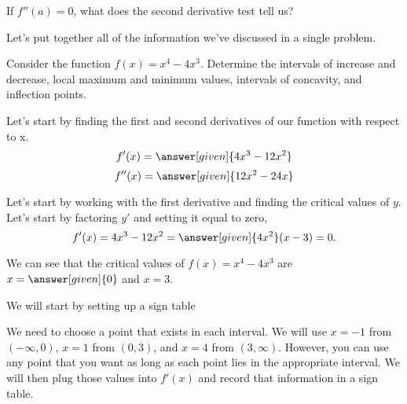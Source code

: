 \documentclass{ximera}
\begin{document}
\begin{example}
\begin{explanation}
\end{explanation}
\end{example}


\begin{question}
  If $f''(a)=0$, what does the second derivative test tell us?
  \begin{multipleChoice}
  \end{multipleChoice}

\end{question}
Let's put together all of the information we've discussed in a single problem.

\begin{example}
    Consider the function $f(x)=x^4-4x^3$. Determine the intervals of increase and decrease, local maximum and minimum values, intervals of concavity, and inflection points.
\begin{explanation}
    Let's start by finding the first and second derivatives of our function with respect to x.
    \[f'(x)=\answer[given]{4x^3-12x^2}\]
    \[f''(x)=\answer[given]{12x^2-24x}\]

Let's start by working with the first derivative and finding the critical values of $y$. Let's start by factoring $y'$ and setting it equal to zero,
\[f'(x)=4x^3-12x^2=\answer[given]{4x^2}(x-3)=0.\]

We can see that the critical values of $f(x)=x^4-4x^3$ are $x=\answer[given]{0}$ and $x=3$.

We will start by setting up a sign table
\begin{figure}[h!]
    \centering
 

\end{figure}

We need to choose a point that exists in each interval. We will use $x=-1$ from $(-\infty,0)$, $x=1$ from $(0,3)$, and $x=4$ from $(3,\infty)$. However, you can use any point that you want as long as each point lies in the appropriate interval. We will then plug those values into $f'(x)$ and record that information in a sign table. 


\end{explanation}
\end{example}
\end{document}
